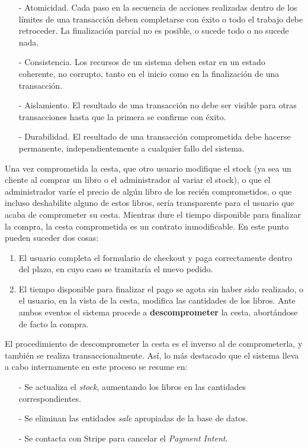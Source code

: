 \documentclass[a4paper,12pt,twoside,openright]{report}
\begin{document}
    \begin{itemize}
    	\item[-] Atomicidad. Cada paso en la secuencia de acciones realizadas dentro de los límites de una transacción deben completarse con éxito o todo el trabajo debe
    	retroceder. La finalización parcial no es posible, o sucede todo o no sucede nada.
    	\item[-] Consistencia. Los recursos de un sistema deben estar en un estado coherente, no corrupto, tanto en el inicio como en la finalización de una transacción.
    	\item[-] Aislamiento. El resultado de una transacción no debe ser visible para otras transacciones hasta que la primera se confirme con éxito.
    	\item[-] Durabilidad. El resultado de una transacción comprometida debe hacerse permanente, independientemente a cualquier fallo del sistema.
    \end{itemize}
    
    Una vez comprometida la cesta, que otro usuario modifique el stock (ya sea un cliente al comprar un libro o el administrador al variar el stock), o que el administrador varíe el precio de algún libro de los recién comprometidos, o que incluso deshabilite alguno de estos libros, sería transparente para el usuario que acaba de comprometer su cesta. Mientras dure el tiempo disponible para finalizar la compra, la cesta comprometida es un contrato inmodificable. En este punto pueden suceder dos cosas: 
    
    \begin{enumerate}
    	\item El usuario completa el formulario de checkout y paga correctamente dentro del plazo, en cuyo caso se tramitaría el nuevo pedido.
    	\item El tiempo disponible para finalizar el pago se agota sin haber sido realizado, o el usuario, en la vista de la cesta, modifica las cantidades de los libros. Ante ambos eventos el sistema procede a \textbf{descomprometer} la cesta, abortándose de facto la compra.
    \end{enumerate}
    
    El procedimiento de descomprometer la cesta es el inverso al de comprometerla, y también se realiza transaccionalmente. Así, lo más destacado que el sistema lleva a cabo internamente en este proceso se resume en:
    
    \begin{itemize}
    	\item[-] Se actualiza el \emph{stock}, aumentando los libros en las cantidades correspondientes.
    	\item[-] Se eliminan las entidades \emph{sale} apropiadas de la base de datos.
    	\item[-] Se contacta con Stripe para cancelar el \emph{Payment Intent}.
    \end{itemize}
\end{document}

